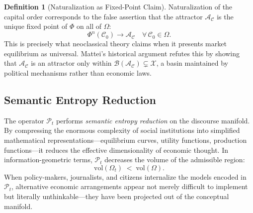 \documentclass[12pt,a4paper]{article}
\theoremstyle{definition}
\newtheorem{definition}{Definition}[section]
\theoremstyle{remark}
\begin{document}
\begin{definition}[Naturalization as Fixed-Point Claim]
Naturalization of the capital order corresponds to the false assertion that the attractor $\mathcal{A}_\mathcal{C}$ is the unique fixed point of $\Phi$ on all of $\Omega$:
\begin{equation}
  \Phi^n(\mathcal{C}_0) \to \mathcal{A}_\mathcal{C} \quad \forall\, \mathcal{C}_0 \in \Omega.
\end{equation}
This is precisely what neoclassical theory claims when it presents market equilibrium as universal. Mattei's historical argument refutes this by showing that $\mathcal{A}_\mathcal{C}$ is an attractor only within $\mathcal{B}(\mathcal{A}_\mathcal{C}) \subsetneq \mathcal{X}$, a basin maintained by political mechanisms rather than economic laws.
\end{definition}

\subsection{Semantic Entropy Reduction}

The operator $\mathcal{P}_t$ performs \emph{semantic entropy reduction} on the discourse manifold. By compressing the enormous complexity of social institutions into simplified mathematical representations---equilibrium curves, utility functions, production functions---it reduces the effective dimensionality of economic thought. In information-geometric terms, $\mathcal{P}_t$ decreases the volume of the admissible region:
\begin{equation}
  \mathrm{vol}(\Omega_t) \;<\; \mathrm{vol}(\Omega).
\end{equation}
When policy-makers, journalists, and citizens internalize the models encoded in $\mathcal{P}_t$, alternative economic arrangements appear not merely difficult to implement but literally unthinkable---they have been projected out of the conceptual manifold.
\end{document}
